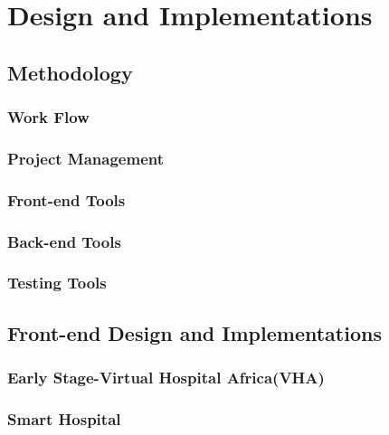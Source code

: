 %
%
\chapter{Design and Implementations}
\label{chap:D&I}

\section{Methodology}
\label{sec:sec01}

\subsection{Work Flow}
\label{subsec:subsec01}

\subsection{Project Management}
\label{subsec:PM}



\subsection{Front-end Tools}
\label{subsec:FETools}


\subsection{Back-end Tools}
\label{subsec:BETools}




\subsection{Testing Tools}
\label{subsec:subsec05}

\section{Front-end Design and Implementations}
\label{sec:sec02}

\subsection{Early Stage-Virtual Hospital Africa(VHA)}
\label{subsec:subsec01}



\subsection{Smart Hospital}
\label{subsec:subsec02}


